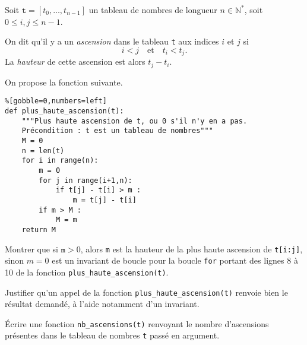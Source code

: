\exer{}
\setcounter{numques}{0}

Soit $\texttt{t} = [t_0,\dots,t_{n-1}]$ un tableau de nombres de longueur $n\in\mathbb{N}^\ast$, soit $0 \leq i,j \leq n-1$. 

On dit qu'il y a un \emph{ascension} dans le tableau \texttt{t} aux indices $i$ et $j$ si 
\begin{equation*}
  i < j \quad\textrm{et}\quad t_i < t_j. 
\end{equation*}
La \emph{hauteur} de cette ascension est alors $t_j - t_i$.

\bigskip{}

On propose la fonction suivante. 

\begin{lstlisting}%[gobble=0,numbers=left]
def plus_haute_ascension(t):
    """Plus haute ascension de t, ou 0 s'il n'y en a pas.
    Précondition : t est un tableau de nombres"""
    M = 0
    n = len(t)
    for i in range(n):
        m = 0
        for j in range(i+1,n):
            if t[j] - t[i] > m :
                m = t[j] - t[i]
        if m > M :
            M = m
    return M
\end{lstlisting}

\bigskip{}

\question{} Montrer que \og si $\texttt{m}>0$, alors \texttt{m} est la hauteur de la plus haute ascension de \texttt{t[i:j]}, sinon $m=0$ \fg{} est un invariant de boucle pour la boucle \texttt{for} portant des lignes 8 à 10 de la fonction \texttt{plus\_haute\_ascension(t)}.

\medskip{} 

\question{} Justifier qu'un appel de la fonction \texttt{plus\_haute\_ascension(t)} renvoie bien le résultat demandé, à l'aide notamment d'un invariant.

\medskip{}

\question{} Écrire une fonction \texttt{nb\_ascensions(t)} renvoyant le nombre d'ascensions présentes dans le tableau de nombres \texttt{t} passé en argument. 
